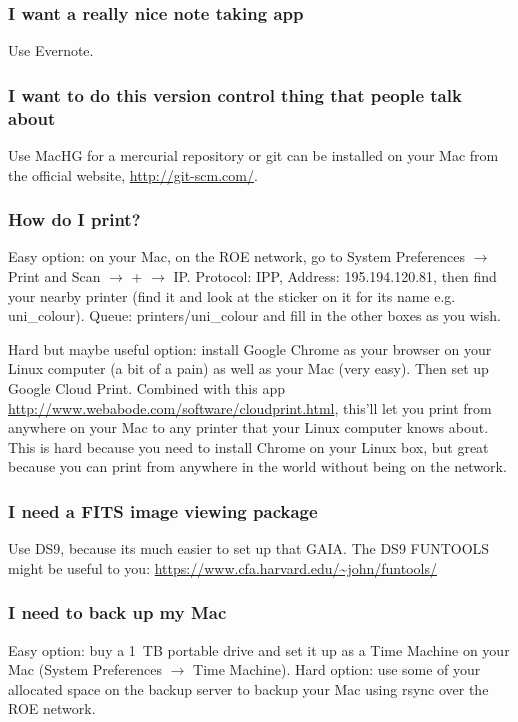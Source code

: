 \subsubsection{I want a really nice note taking app}
Use Evernote.

\subsubsection{I want to do this version control thing that people talk about}
Use MacHG for a mercurial repository or git can be installed on your Mac from the official website, \url{http://git-scm.com/}.

\subsubsection{How do I print?}
Easy option: on your Mac, on the ROE network, go to System Preferences $\rightarrow$ Print and Scan $\rightarrow$ + $\rightarrow$ IP.
Protocol: IPP,
Address: 195.194.120.81,
then find your nearby printer (find it and look at the sticker on it for its name e.g. uni\_colour).
Queue: printers/uni\_colour
and fill in the other boxes as you wish.

Hard but maybe useful option: install Google Chrome as your browser on your Linux computer (a bit of a pain) as well as your Mac (very easy). 
Then set up Google Cloud Print. 
Combined with this app \url{http://www.webabode.com/software/cloudprint.html}, this'll let you print from anywhere on your Mac to any printer that your Linux computer knows about.
This is hard because you need to install Chrome on your Linux box, but great because you can print from anywhere in the world without being on the network.

\subsubsection{I need a FITS image viewing package}
Use DS9, because its much easier to set up that GAIA.
The DS9 FUNTOOLS might be useful to you: \url{https://www.cfa.harvard.edu/~john/funtools/}

\subsubsection{I need to back up my Mac}
Easy option: buy a 1~TB portable drive and set it up as a Time Machine on your Mac (System Preferences $\rightarrow$ Time Machine).
Hard option: use some of your allocated space on the backup server to backup your Mac using rsync over the ROE network.


